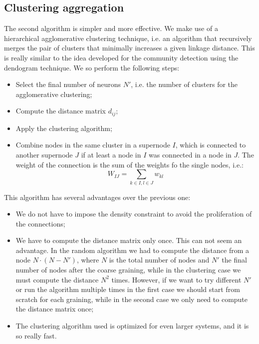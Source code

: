 \subsection{Clustering aggregation}
The second algorithm is simpler and more effective. We make use of a hierarchical agglomerative
clustering technique, i.e. an algorithm that recursively merges the pair of clusters that 
minimally increases a given linkage distance. This is really similar to the idea developed 
for the community detection using the dendogram technique.
We so perform the following steps:
\begin{itemize}
    \item Select the  final number of neurons $N'$, i.e. the number of clusters for the agglomerative
        clustering;
    \item Compute the distance matrix $d_{ij}$;
    \item Apply the clustering algorithm;
    \item Combine nodes in the same cluster in a supernode $I$, which is connected to another 
        supernode $J$ if at least a node in $I$ was connected in a node in $J$. The weight of the 
        connection is the sum of the weights fo the single nodes, i.e.:
        $$
        W_{IJ} = \sum_{k\in I, l\in J} w_{kl}
        $$
\end{itemize}
This algorithm has several advantages over the previous one:
\begin{itemize}
    \item We do not have to impose the density constraint to avoid the proliferation of the 
        connections;
    \item We have to compute the distance matrix only once. This can not seem an advantage.
        In the random algorithm we had to compute the distance from a node $N\cdot (N-N')$,
        where $N$ is the total number of nodes and $N'$ the final number of nodes after the 
        coarse graining, while in the clustering case we must compute the distance $N^2$ times.
        However, if we want to try different $N'$ or run the algorithm multiple times in the 
        first case we should start from scratch for each graining, while in the second case
        we only need to compute the distance matrix once;
    \item The clustering algorithm used is optimized for even larger systems, and it is so really
        fast.
\end{itemize}


